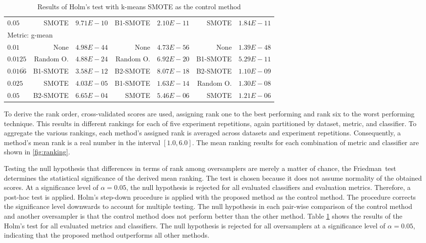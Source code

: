 \documentclass[sort&compress]{elsarticle}
\begin{document}
\begin{table}[!htb]
\begin{tabular}{lrrrrrr}
	$0.05$        		& SMOTE             & $9.71E-10$ & B1-SMOTE          & $2.10E-11$ & SMOTE             & $1.84E-11$ \\
	\multicolumn{2}{l}{Metric: g-mean} & & & & & \\
	$0.01$        		& None              & $4.98E-44$    & None              & $4.73E-56$ & None              & $1.39E-48$ \\
	$0.0125$      		& Random O. & $4.88E-24$    & Random O. & $6.92E-20$ & B1-SMOTE          & $5.29E-11$ \\
	$0.01\overline{66}$ 	& B1-SMOTE          & $3.58E-12$    & B2-SMOTE          & $8.07E-18$ & B2-SMOTE          & $1.10E-09$ \\
	$0.025$       		& SMOTE             & $4.03E-05$    & B1-SMOTE          & $1.63E-14$ & Random O. & $1.30E-08$ \\
	$0.05$        		& B2-SMOTE          & $6.65E-04$ & SMOTE             & $5.46E-06$ & SMOTE             & $1.21E-06$ \\
	\bottomrule
	\end{tabular}
	\caption{Results of Holm's test with k-means \ac{SMOTE} as the control method}
	\label{tab:holm}
\end{table}

To derive the rank order, cross-validated scores are used, assigning rank one to the best performing and rank six to the worst performing technique. This results in different rankings for each of five experiment repetitions, again partitioned by dataset, metric, and classifier. To aggregate the various rankings, each method's assigned rank is averaged across datasets and experiment repetitions. Consequently, a method's mean rank is a real number in the interval $[1.0,6.0]$. The mean ranking results for each combination of metric and classifier are shown in \cref{fig:ranking}.

Testing the null hypothesis that differences in terms of rank among oversamplers are merely a matter of chance, the Friedman~test determines the statistical significance of the derived mean ranking. The test is chosen because it does not assume normality of the obtained scores. At a significance level of $\alpha = 0.05$, the null hypothesis is rejected for all evaluated classifiers and evaluation metrics. Therefore, a post-hoc test is applied. Holm's step-down procedure is applied with the proposed method as the control method. The procedure corrects the significance level downwards to account for multiple testing. The null hypothesis in each pair-wise comparison of the control method and another oversampler is that the control method does not perform better than the other method. Table \ref{tab:holm} shows the results of the Holm's test for all evaluated metrics and classifiers. The null hypothesis is rejected for all oversamplers at a significance level of $\alpha = 0.05$, indicating that the proposed method outperforms all other methods.
\end{document}
